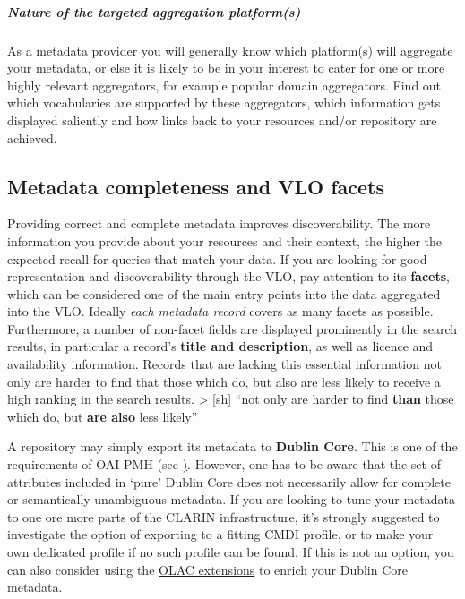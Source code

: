 \subparagraph{Nature of the targeted aggregation
platform(s)}\label{nature-of-the-targeted-aggregation-platforms}

As a metadata provider you will generally know which platform(s) will
aggregate your metadata, or else it is likely to be in your interest to
cater for one or more highly relevant aggregators, for example popular
domain aggregators. Find out which vocabularies are supported by these
aggregators, which information gets displayed saliently and how links
back to your resources and/or repository are achieved.

\subsection{Metadata completeness and VLO
facets}\label{metadata-completeness-and-vlo-facets}

Providing correct and complete metadata improves discoverability. The
more information you provide about your resources and their context, the
higher the expected recall for queries that match your data. If you are
looking for good representation and discoverability through the VLO, pay
attention to its \textbf{facets}, which can be considered one of the
main entry points into the data aggregated into the VLO. Ideally
\emph{each metadata record} covers as many facets as possible.
Furthermore, a number of non-facet fields are displayed prominently in
the search results, in particular a record's \textbf{title and
description}, as well as licence and availability information. Records
that are lacking this essential information not only are harder to find
that those which do, but also are less likely to receive a high ranking
in the search results. \textgreater{} {[}sh{]} ``not only are harder to
find \textbf{than} those which do, but \textbf{are also} less likely''

A repository may simply export its metadata to \textbf{Dublin Core}.
This is one of the requirements of OAI-PMH (see
\href{https://www.openarchives.org/OAI/2.0/openarchivesprotocol.2015-01-08.htm\#Record}).
However, one has to be aware that the set of attributes included in
`pure' Dublin Core does not necessarily allow for complete or
semantically unambiguous metadata. If you are looking to tune your
metadata to one ore more parts of the CLARIN infrastructure, it's
strongly suggested to investigate the option of exporting to a fitting
CMDI profile, or to make your own dedicated profile if no such profile
can be found. If this is not an option, you can also consider using the
\href{http://www.language-archives.org/OLAC/metadata.html}{OLAC
extensions} to enrich your Dublin Core metadata.

